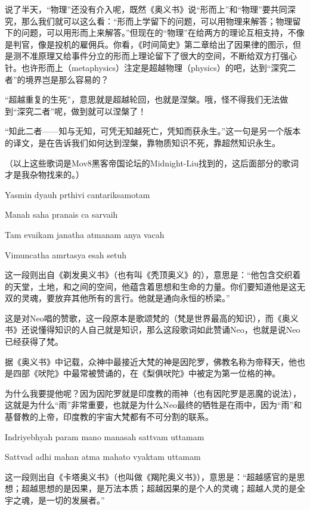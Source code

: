 \documentclass[UTF8]{ctexart}
\newenvironment{myquote}{\color{green} \setlength{\leftskip}{6em} \setlength{\rightskip}{4em} \setlength{\parindent}{-2em}}{\par}
\begin{document}
说了半天，“物理”还没有介入呢，既然《奥义书》说“形而上”和“物理”要共同深究，那么我们就可以这么看：“形而上学留下的问题，可以用物理来解答；物理留下的问题，可以用形而上来解答。”但现在的“物理”在给两方的理论互相支持，不像是判官，像是投机的雇佣兵。你看，《时间简史》第二章给出了因果律的图示，但是测不准原理又给事件分立的形而上理论留下了很大的空间，不断给双方打强心针。也许形而上（metaphysics）注定是超越物理（physics）的吧，达到“深究二者”的境界岂是那么容易的？

“超越重复的生死”，意思就是超越轮回，也就是涅槃。哦，怪不得我们无法做到“深究二者”呢，做到就可以涅槃了！

“知此二者——知与无知，可凭无知越死亡，凭知而获永生。”这一句是另一个版本的译文，是在告诉我们如何达到涅槃，靠物质知识不死，靠超然知识永生。

（以上这些歌词是Mov8黑客帝国论坛的Midnight-Liu找到的，这后面部分的歌词才是我杂物找来的。）

\begin{myquote}
Yasmin dyauh prthivi cantariksamotam

Manah saha pranais ca sarvaih

Tam evaikam janatha atmanam anya vacah

Vimuncatha amrtasya esah setuh
\end{myquote}

这一段则出自《剃发奥义书》（也有叫《秃顶奥义》的），意思是：“他包含交织着的天堂，土地，和之间的空间，他蕴含着思想和生命的力量。你们要知道他是这无双的灵魂，要放弃其他所有的言行。他就是通向永恒的桥梁。”

这是对Neo唱的赞歌，这一段原本是歌颂梵的（梵是世界最高的知识），而《奥义书》还说懂得知识的人自己就是知识，那么这段歌词如此赞诵Neo，也就是说Neo已经获得了梵。

据《奥义书》中记载，众神中最接近大梵的神是因陀罗，佛教名称为帝释天，他也是四部《吠陀》中最常被赞诵的，在《梨俱吠陀》中被定为第一位格的神。

为什么我要提他呢？因为因陀罗就是印度教的雨神（也有因陀罗是恶魔的说法），这就是为什么“雨”非常重要，也就是为什么Neo最终的牺牲是在雨中，因为“雨”和基督教的上帝，印度教的宇宙大梵都有不可分割的联系。

\begin{myquote}
Indriyebhyah param mano manasah sattvam uttamam

Sattvad adhi mahan atma mahato vyaktam uttamam
\end{myquote}

这一段则出自《卡塔奥义书》（也叫做《羯陀奥义书》），意思是：“超越感官的是思想；超越思想的是因果，是万法本质；超越因果的是个人的灵魂；超越人灵的是全宇之魂，是一切的发展者。”
\end{document}
